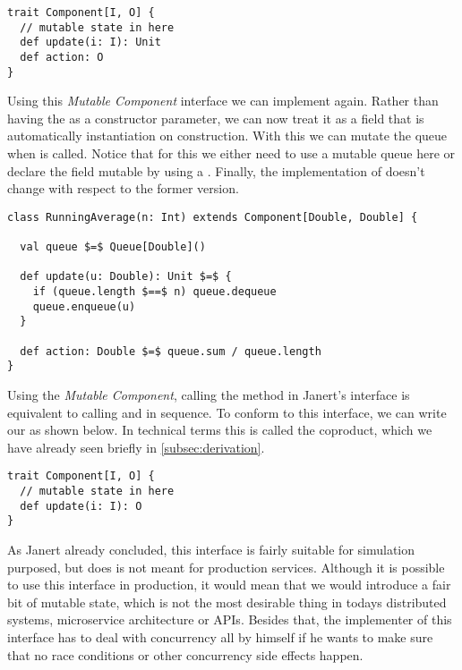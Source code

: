 \begin{lstlisting}[style=InlineScalaStyle]
trait Component[I, O] {
  // mutable state in here
  def update(i: I): Unit
  def action: O
}
\end{lstlisting}

Using this \textit{Mutable Component} interface we can implement  again. Rather than having the  as a constructor parameter, we can now treat it as a field that is automatically instantiation on construction. With this we can mutate the queue when  is called. Notice that for this we either need to use a mutable queue here or declare the field mutable by using a . Finally, the implementation of  doesn't change with respect to the former version.

\begin{lstlisting}[style=ScalaStyle]
class RunningAverage(n: Int) extends Component[Double, Double] {

  val queue $=$ Queue[Double]()

  def update(u: Double): Unit $=$ {
    if (queue.length $==$ n) queue.dequeue
    queue.enqueue(u)
  }

  def action: Double $=$ queue.sum / queue.length
}
\end{lstlisting}

Using the \textit{Mutable Component}, calling the  method in Janert's \comp interface is equivalent to calling  and  in sequence. To conform to this interface, we can write our \comp as shown below. In technical terms this is called the coproduct, which we have already seen briefly in \cref{subsec:derivation}.

\begin{lstlisting}[style=InlineScalaStyle]
trait Component[I, O] {
  // mutable state in here
  def update(i: I): O
}
\end{lstlisting}

As Janert already concluded, this interface is fairly suitable for simulation purposed, but does is not meant for production services. Although it is possible to use this interface in production, it would mean that we would introduce a fair bit of mutable state, which is not the most desirable thing in todays distributed systems, microservice architecture or APIs. Besides that, the implementer of this \comp interface has to deal with concurrency all by himself if he wants to make sure that no race conditions or other concurrency side effects happen.

